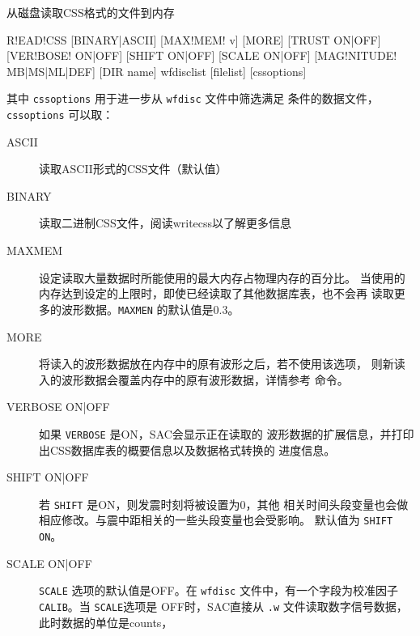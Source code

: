 \label{cmd:readcss}

从磁盘读取CSS格式的文件到内存

\begin{SACSTX}
R!EAD!CSS [BINARY|ASCII] [MAX!MEM! v] [MORE] [TRUST ON|OFF] [VER!BOSE! ON|OFF]
    [SHIFT ON|OFF] [SCALE ON|OFF] [MAG!NITUDE! MB|MS|ML|DEF] [DIR name] wfdisclist
    [filelist] [cssoptions]
\end{SACSTX}
其中 \texttt{cssoptions} 用于进一步从 \texttt{wfdisc} 文件中筛选满足
条件的数据文件，\texttt{cssoptions} 可以取：
\begin{SACSTX}
\end{SACSTX}

\begin{description}
\item [ASCII] 读取ASCII形式的CSS文件（默认值）
\item [BINARY] 读取二进制CSS文件，阅读writecss以了解更多信息
\item [MAXMEM] 设定读取大量数据时所能使用的最大内存占物理内存的百分比。
    当使用的内存达到设定的上限时，即使已经读取了其他数据库表，也不会再
    读取更多的波形数据。\texttt{MAXMEN} 的默认值是0.3。
\item [MORE] 将读入的波形数据放在内存中的原有波形之后，若不使用该选项，
    则新读入的波形数据会覆盖内存中的原有波形数据，详情参考 
    命令。
\item [VERBOSE ON|OFF] 如果 \texttt{VERBOSE} 是ON，SAC会显示正在读取的
    波形数据的扩展信息，并打印出CSS数据库表的概要信息以及数据格式转换的
    进度信息。
\item [SHIFT ON|OFF] 若 \texttt{SHIFT} 是ON，则发震时刻将被设置为0，其他
    相关时间头段变量也会做相应修改。与震中距相关的一些头段变量也会受影响。
    默认值为 \texttt{SHIFT ON}。
\item [SCALE ON|OFF] \texttt{SCALE} 选项的默认值是OFF。在 \texttt{wfdisc}
    文件中，有一个字段为校准因子 \texttt{CALIB}。当 \texttt{SCALE}选项是
    OFF时，SAC直接从 \texttt{.w} 文件读取数字信号数据，此时数据的单位是counts，

\end{description}
